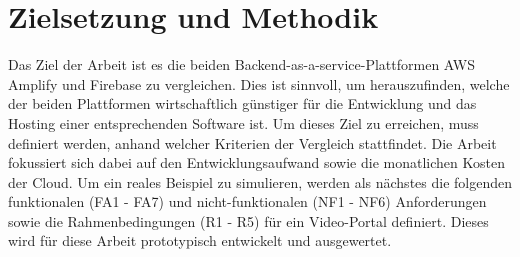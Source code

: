 \section{Zielsetzung und Methodik}

Das Ziel der Arbeit ist es die beiden Backend-as-a-service-Plattformen \ac{AWS} Amplify und Firebase zu vergleichen. Dies ist sinnvoll, um herauszufinden, welche der beiden Plattformen wirtschaftlich günstiger für die Entwicklung und das Hosting einer entsprechenden Software ist. Um dieses Ziel zu erreichen, muss definiert werden, anhand welcher Kriterien der Vergleich stattfindet. Die Arbeit fokussiert sich dabei auf den Entwicklungsaufwand sowie die monatlichen Kosten der Cloud. Um ein reales Beispiel zu simulieren, werden als nächstes die folgenden funktionalen (FA1 - FA7) und nicht-funktionalen (NF1 - NF6) Anforderungen sowie die Rahmenbedingungen (R1 - R5) für ein Video-Portal definiert. Dieses wird für diese Arbeit prototypisch entwickelt und ausgewertet.

